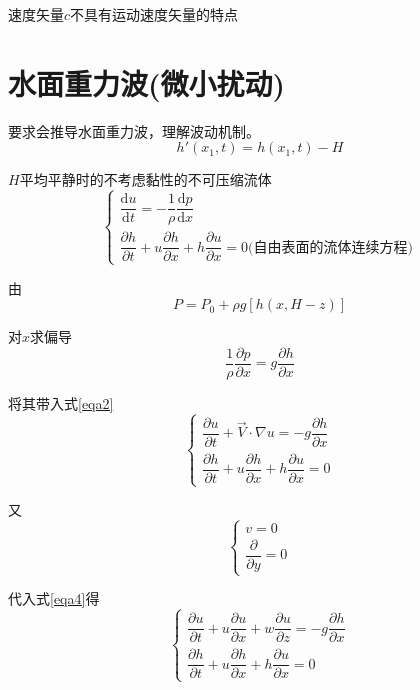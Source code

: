 \documentclass[a4paper,oneside]{ctexbook}
\begin{document}
速度矢量\(c\)不具有运动速度矢量的特点

\section{水面重力波(微小扰动)}

要求会推导水面重力波，理解波动机制。
\begin{equation}
    h'(x_1,t)=h(x_1,t)-H
\end{equation}

\(H\)平均平静时的不考虑黏性的不可压缩流体
\begin{equation}
    \begin{cases}
    \dfrac{\mathrm{d}u}{\mathrm{d}t}=-\dfrac{1}{\rho}\dfrac{\mathrm{d}p}{\mathrm{d}x}\\
    \dfrac{\partial{h}}{\partial{t}}+u\dfrac{\partial{h}}{\partial{x}}+h\dfrac{\partial{u}}{\partial{x}}=0\text{(自由表面的流体连续方程)}
    \end{cases}
    \label{eqa2}
\end{equation}

由
\begin{equation}
    P=P_0+\rho{g}[h(x,H-z)]
\end{equation}

对\(x\)求偏导
\begin{equation}
    \dfrac{1}{\rho}\dfrac{\partial{p}}{\partial{x}}=g\dfrac{\partial{h}}{\partial{x}}
    \label{eqa3}
\end{equation}

将其带入式\ref{eqa2}
\begin{equation}
    \begin{cases}
    \dfrac{\partial{u}}{\partial{t}}+\overrightarrow{V}\cdot\nabla{u}=-g\dfrac{\partial{h}}{\partial{x}}\\
    \dfrac{\partial{h}}{\partial{t}}+u\dfrac{\partial{h}}{\partial{x}}+h\dfrac{\partial{u}}{\partial{x}}=0
    \end{cases}
    \label{eqa4}
\end{equation}

又
\begin{equation}
    \begin{cases}
    v=0\\
    \dfrac{\partial}{\partial{y}}=0
    \end{cases}
\end{equation}

代入式\ref{eqa4}得
\begin{equation}
    \begin{cases}
    \dfrac{\partial{u}}{\partial{t}}+u\dfrac{\partial{u}}{\partial{x}}+w\dfrac{\partial{u}}{\partial{z}}=-g\dfrac{\partial{h}}{\partial{x}}\\
    \dfrac{\partial{h}}{\partial{t}}+u\dfrac{\partial{h}}{\partial{x}}+h\dfrac{\partial{u}}{\partial{x}}=0
    \end{cases}
    \label{eqa5}
\end{equation}
\end{document}
